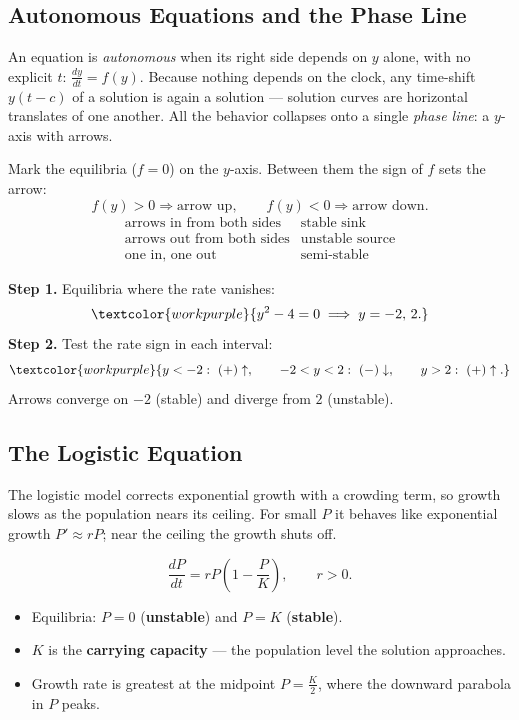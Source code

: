 \subsection{Autonomous Equations and the Phase Line}

An equation is \emph{autonomous} when its right side depends on $y$ alone, with
no explicit $t$: $\frac{dy}{dt} = f(y)$. Because nothing depends on the clock,
any time-shift $y(t-c)$ of a solution is again a solution --- solution curves are
horizontal translates of one another. All the behavior collapses onto a single
\emph{phase line}: a $y$-axis with arrows.

\begin{formulabox}
Mark the equilibria ($f=0$) on the $y$-axis. Between them the sign of $f$ sets
the arrow:
\[ f(y) > 0 \Rightarrow \text{arrow up},\qquad f(y) < 0 \Rightarrow \text{arrow down}. \]
\[
\begin{array}{ll}
\text{arrows in from both sides} & \text{stable sink}\\
\text{arrows out from both sides} & \text{unstable source}\\
\text{one in, one out} & \text{semi-stable}
\end{array}
\]
\end{formulabox}

\begin{examplebox}[Worked Example 4.2: Phase line for $\frac{dy}{dt}=y^{2}-4$]
\textbf{Step 1.} Equilibria where the rate vanishes:
\[ \textcolor{workpurple}{y^{2} - 4 = 0 \;\Longrightarrow\; y = -2,\,2.} \]
\textbf{Step 2.} Test the rate sign in each interval:
\[ \textcolor{workpurple}{y<-2:\ (+)\uparrow, \qquad -2<y<2:\ (-)\downarrow, \qquad y>2:\ (+)\uparrow.} \]
Arrows converge on $-2$ (stable) and diverge from $2$ (unstable).
\end{examplebox}

\subsection{The Logistic Equation}

The logistic model corrects exponential growth with a crowding term, so growth
slows as the population nears its ceiling. For small $P$ it behaves like
exponential growth $P' \approx rP$; near the ceiling the growth shuts off.

\begin{formulabox}
\[ \frac{dP}{dt} = rP\!\left(1 - \frac{P}{K}\right), \qquad r>0. \]
\begin{itemize}[leftmargin=1.4em, itemsep=2pt]
    \item Equilibria: $P = 0$ (\textbf{unstable}) and $P = K$ (\textbf{stable}).
    \item $K$ is the \textbf{carrying capacity} --- the population level the
          solution approaches.
    \item Growth rate is greatest at the midpoint $P = \tfrac{K}{2}$, where the
          downward parabola in $P$ peaks.
\end{itemize}
\end{formulabox}

